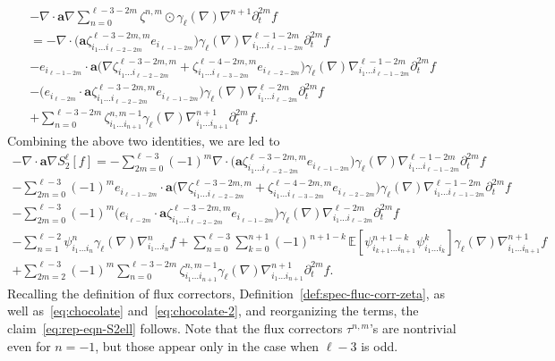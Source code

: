 \documentclass[10pt]{amsart}
\theoremstyle{plain}
\theoremstyle{definition}
\numberwithin{equation}{section}
\newcommand{\ee}{e}
\newcommand{\Aa}{\boldsymbol a}
\newcommand{\expec}[1]{\mathbb{E}\left[ #1 \right]}
\begin{document}
\begin{multline*}
-\nabla\cdot\Aa\nabla\sum_{n=0}^{\ell-3-2m}\zeta^{n,m} \odot \gamma_{\ell}(\nabla)\nabla^{n+1}\partial_t^{2m} f\\
=
-\nabla\cdot\big(\Aa\zeta^{\ell-3-2m,m}_{i_1\ldots i_{\ell-2-2m}}\ee_{i_{\ell-1-2m}}\big)\gamma_{\ell}(\nabla)\nabla^{\ell-1-2m}_{i_1\ldots i_{\ell-1-2m}}\partial_t^{2m} f\\
-\ee_{i_{\ell-1-2m}}\cdot\Aa\big(\nabla\zeta^{\ell-3-2m,m}_{i_1\ldots i_{\ell-2-2m}}+\zeta^{\ell-4-2m,m}_{i_1\ldots i_{\ell-3-2m}}\ee_{i_{\ell-2-2m}}\big)\gamma_{\ell}(\nabla)\nabla^{\ell-1-2m}_{i_1\ldots i_{\ell-1-2m}}\partial_t^{2m} f\\
-\big(\ee_{i_{\ell-2m}}\cdot\Aa\zeta^{\ell-3-2m,m}_{i_1\ldots i_{\ell-2-2m}}\ee_{i_{\ell-1-2m}}\big)\gamma_{\ell}(\nabla)\nabla^{\ell-2m}_{i_1\ldots i_{\ell-2m}}\partial_t^{2m} f\\
+\sum_{n=0}^{\ell-3-2m}\zeta^{n,m-1}_{i_1\ldots i_{n+1}}\gamma_{\ell}(\nabla)\nabla^{n+1}_{i_1\ldots i_{n+1}}\partial_t^{2m} f.
\end{multline*}
Combining the above two identities, we are led to\vspace*{-3pt}
\begin{multline*}
-\nabla\cdot\Aa\nabla S_2^\ell[f]
=-\sum_{2m=0}^{\ell-3}(-1)^m\nabla\cdot\big(\Aa\zeta^{\ell-3-2m,m}_{i_1\ldots i_{\ell-2-2m}}\ee_{i_{\ell-1-2m}}\big)\gamma_{\ell}(\nabla)\nabla^{\ell-1-2m}_{i_1\ldots i_{\ell-1-2m}}\partial_t^{2m} f\\
-\sum_{2m=0}^{\ell-3}(-1)^m\ee_{i_{\ell-1-2m}}\cdot\Aa\big(\nabla\zeta^{\ell-3-2m,m}_{i_1\ldots i_{\ell-2-2m}}+\zeta^{\ell-4-2m,m}_{i_1\ldots i_{\ell-3-2m}}\ee_{i_{\ell-2-2m}}\big)\gamma_{\ell}(\nabla)\nabla^{\ell-1-2m}_{i_1\ldots i_{\ell-1-2m}}\partial_t^{2m} f\\
-\sum_{2m=0}^{\ell-3}(-1)^m\big(\ee_{i_{\ell-2m}}\cdot\Aa\zeta^{\ell-3-2m,m}_{i_1\ldots i_{\ell-2-2m}}\ee_{i_{\ell-1-2m}}\big)\gamma_{\ell}(\nabla)\nabla^{\ell-2m}_{i_1\ldots i_{\ell-2m}}\partial_t^{2m} f\\
-\sum_{n=1}^{\ell-2}\psi^{n}_{i_1\ldots i_{n}}\gamma_{\ell}(\nabla)\nabla^{n}_{i_1\ldots i_{n}} f
+\sum_{n=0}^{\ell-3}\sum_{k=0}^{n+1}(-1)^{n+1-k}\,\expec{\psi^{n+1-k}_{i_{k+1}\ldots i_{n+1}}\psi^k_{i_{1}\ldots i_k}}\gamma_{\ell}(\nabla)\nabla^{n+1}_{i_1\ldots i_{n+1}} f\\
+\sum_{2m=2}^{\ell-3}(-1)^m\sum_{n=0}^{\ell-3-2m}\zeta^{n,m-1}_{i_1\ldots i_{n+1}}\gamma_{\ell}(\nabla)\nabla^{n+1}_{i_1\ldots i_{n+1}}\partial_t^{2m} f.
\end{multline*}
Recalling the definition of flux correctors, \cf Definition~\ref{def:spec-fluc-corr-zeta}, as well as~\eqref{eq:chocolate} and~\eqref{eq:chocolate-2}, and reorganizing the terms, the claim~\eqref{eq:rep-eqn-S2ell} follows. Note that the flux correctors $\tau^{n,m}$'s are nontrivial even for $n=-1$, but those appear only in the case when $\ell-3$ is odd.
\end{document}
